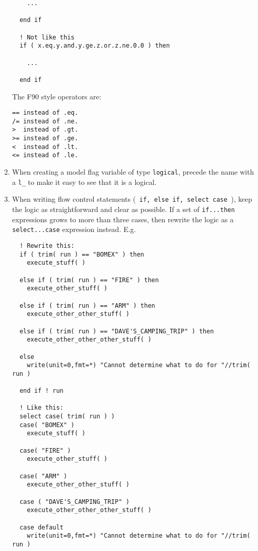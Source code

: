 \documentclass[letterpaper,12pt]{article}
\begin{document}
\begin{enumerate}
\begin{verbatim}
    ...

  end if

  ! Not like this
  if ( x.eq.y.and.y.ge.z.or.z.ne.0.0 ) then

    ...

  end if

\end{verbatim}

The F90 style operators are:
\newline

\begin{verbatim}
== instead of .eq.
/= instead of .ne.
>  instead of .gt.
>= instead of .ge.
<  instead of .lt.
<= instead of .le.
\end{verbatim}

\item When creating a model flag variable of type \texttt{logical}, precede the
 name with a \verb|l_| to make it easy to see that it is a logical.

\item When writing flow control statements 
(\texttt{ if, else if, select case }), keep the logic as straightforward and
clear as possible.  If a set of \texttt{if...then} expressions grows to more
than three cases, then rewrite the logic as a \texttt{select...case} expression
instead. E.g.

\begin{verbatim}
  ! Rewrite this:
  if ( trim( run ) == "BOMEX" ) then
    execute_stuff( )

  else if ( trim( run ) == "FIRE" ) then
    execute_other_stuff( )

  else if ( trim( run ) == "ARM" ) then
    execute_other_other_stuff( ) 

  else if ( trim( run ) == "DAVE'S_CAMPING_TRIP" ) then
    execute_other_other_other_stuff( ) 

  else
    write(unit=0,fmt=*) "Cannot determine what to do for "//trim( run )

  end if ! run

  ! Like this:
  select case( trim( run ) )
  case( "BOMEX" )
    execute_stuff( )

  case( "FIRE" )
    execute_other_stuff( )

  case( "ARM" )
    execute_other_other_stuff( )
 
  case ( "DAVE'S_CAMPING_TRIP" ) 
    execute_other_other_other_stuff( ) 

  case default
    write(unit=0,fmt=*) "Cannot determine what to do for "//trim( run )


\end{verbatim}
\end{enumerate}
\end{document}
